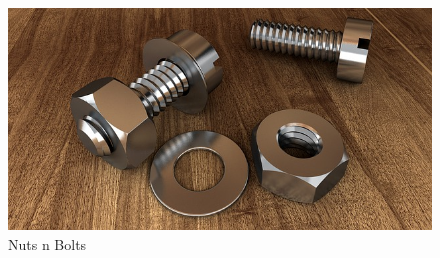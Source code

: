\documentclass[10pt, a4paper, twocolumn]{article} %
\begin{document}




\begin{figure}
	\includegraphics[width=\linewidth]{screw-1924174_640.jpg} %
	\caption{Nuts n Bolts} %
	\label{screw-1924174_640} %
\end{figure}
\end{document}
